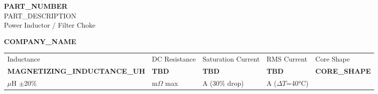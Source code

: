 \documentclass[10pt,a4paper]{article}
\begin{document}

\vspace*{-8mm}
\begin{minipage}[t]{0.65\textwidth}
    \color{white}
    {\fontsize{24}{28}\selectfont\bfseries {{PART_NUMBER}}}\\[3mm]
    {\large {{PART_DESCRIPTION}}}\\[1mm]
    {\normalsize Power Inductor / Filter Choke}
\end{minipage}
\hfill
\begin{minipage}[t]{0.30\textwidth}
    \raggedleft
    \color{white}
    {\large\bfseries {{COMPANY_NAME}}}\\[2mm]
\end{minipage}

\vspace{10mm}

\begin{tcolorbox}[
    colback=lightbg,
    colframe=primary,
    boxrule=0.5pt,
    arc=2mm,
    left=4mm,
    right=4mm,
    top=3mm,
    bottom=3mm
]
\centering
\renewcommand{\arraystretch}{1.4}
\begin{tabular}{C{30mm}C{30mm}C{30mm}C{30mm}C{30mm}}
    \textcolor{textmuted}{\footnotesize Inductance} & 
    \textcolor{textmuted}{\footnotesize DC Resistance} & 
    \textcolor{textmuted}{\footnotesize Saturation Current} & 
    \textcolor{textmuted}{\footnotesize RMS Current} & 
    \textcolor{textmuted}{\footnotesize Core Shape} \\
    {\Large\bfseries\color{primary} {{MAGNETIZING_INDUCTANCE_UH}}} & 
    {\Large\bfseries\color{primary} TBD} & 
    {\Large\bfseries\color{primary} TBD} & 
    {\Large\bfseries\color{primary} TBD} & 
    {\Large\bfseries\color{primary} {{CORE_SHAPE}}} \\
    \textcolor{textmuted}{\footnotesize $\mu$H $\pm$20\%} & 
    \textcolor{textmuted}{\footnotesize m$\Omega$ max} & 
    \textcolor{textmuted}{\footnotesize A (30\% drop)} & 
    \textcolor{textmuted}{\footnotesize A ($\Delta T$=40°C)} & 
    \textcolor{textmuted}{\footnotesize} \\
\end{tabular}
\end{tcolorbox}
\end{document}
